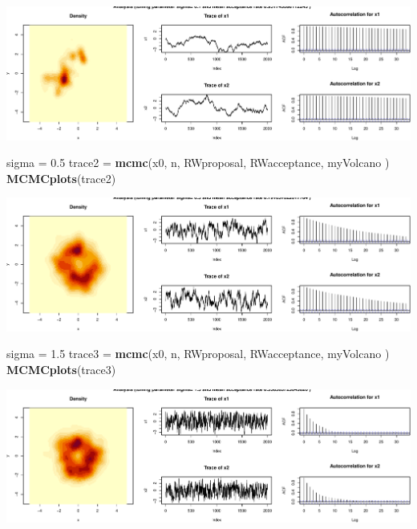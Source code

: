 \documentclass[
]{article}
\newenvironment{Shaded}{\begin{snugshade}}{\end{snugshade}}
\newcommand{\FloatTok}[1]{\textcolor[rgb]{0.00,0.00,0.81}{#1}}
\newcommand{\KeywordTok}[1]{\textcolor[rgb]{0.13,0.29,0.53}{\textbf{#1}}}
\newcommand{\NormalTok}[1]{#1}
\newcommand{\StringTok}[1]{\textcolor[rgb]{0.31,0.60,0.02}{#1}}
\begin{document}
\includegraphics{Project1_files/figure-latex/RandomWalk3-1.pdf}

\begin{Shaded}
\begin{Highlighting}[]
\NormalTok{sigma =}\StringTok{ }\FloatTok{0.5}
\NormalTok{trace2 =}\StringTok{ }\KeywordTok{mcmc}\NormalTok{(x0, n, RWproposal, RWacceptance, myVolcano )}
\KeywordTok{MCMCplots}\NormalTok{(trace2)}
\end{Highlighting}
\end{Shaded}

\includegraphics{Project1_files/figure-latex/RandomWalk3-2.pdf}

\begin{Shaded}
\begin{Highlighting}[]
\NormalTok{sigma =}\StringTok{ }\FloatTok{1.5}
\NormalTok{trace3 =}\StringTok{ }\KeywordTok{mcmc}\NormalTok{(x0, n, RWproposal, RWacceptance, myVolcano )}
\KeywordTok{MCMCplots}\NormalTok{(trace3)}
\end{Highlighting}
\end{Shaded}

\includegraphics{Project1_files/figure-latex/RandomWalk3-3.pdf}
\end{document}
